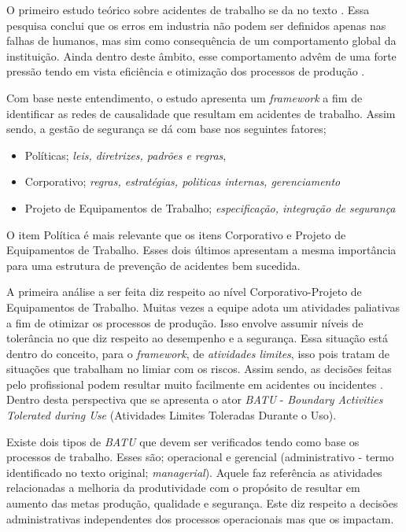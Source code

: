 O primeiro estudo teórico sobre acidentes de trabalho se da no texto \cite{riskoldschool}. Essa pesquisa conclui que os erros em industria não podem ser definidos apenas nas falhas de 
humanos, mas sim como consequência de um comportamento global da instituição. Ainda dentro deste âmbito, esse comportamento advêm de uma forte pressão tendo em vista eficiência e otimização dos processos de produção \cite{riskoldschool} \cite{safety}.

Com base neste entendimento, o estudo \cite{safety} apresenta um \textit{framework} a fim de identificar as redes de causalidade que resultam em acidentes de trabalho. Assim sendo, a gestão de 
segurança se dá com base nos seguintes fatores; 
\begin{itemize}
    \item Políticas; \textit{leis, diretrizes, padrões e regras},
    \item Corporativo; \textit{regras, estratégias, politicas internas, gerenciamento}
    \item Projeto de Equipamentos de Trabalho; \textit{especificação, integração de segurança}
\end{itemize}

O item Política é mais relevante que os itens Corporativo e Projeto de Equipamentos de Trabalho. Esses dois últimos apresentam a mesma importância para uma estrutura de prevenção de acidentes 
bem sucedida. 

A primeira análise a ser feita diz respeito ao nível Corporativo-Projeto de Equipamentos de Trabalho. Muitas vezes a equipe adota um atividades paliativas a fim de otimizar os processos de produção. Isso envolve assumir níveis de tolerância no que diz respeito ao desempenho e a segurança. Essa situação está dentro do conceito, para o \textit{framework}, de \textit{atividades
limites}, isso pois tratam de situações que trabalham no limiar com os riscos. Assim sendo, as decisões feitas pelo profissional podem resultar muito facilmente em acidentes ou incidentes \cite{safety}. 
Dentro desta perspectiva que se apresenta o ator \textit{BATU} - \textit{Boundary Activities Tolerated during Use} (Atividades Limites Toleradas Durante o Uso).

Existe dois tipos de \textit{BATU} que devem ser verificados tendo como base os processos de trabalho. Esses são; operacional e gerencial (administrativo - termo identificado no texto original; \textit{managerial}). Aquele faz referência as atividades relacionadas a melhoria da produtividade com o propósito de resultar em aumento das metas produção, qualidade e segurança. Este diz respeito a decisões administrativas independentes dos processos operacionais mas que os impactam.

